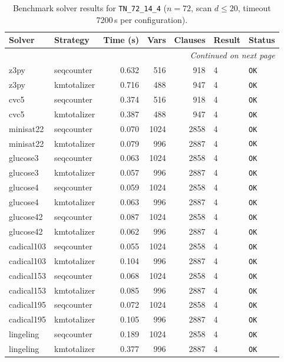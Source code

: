 \begin{longtable}{llrrrl p{}}
\caption{Benchmark solver results for \texttt{TN\_72\_14\_4} ($n=72$, scan $d \leq 20$, timeout 7200\,s per configuration).} \label{tab:bench-TN_72_14_4} \\
\toprule
Solver & Strategy & Time (s) & Vars & Clauses & Result & Status \\
\midrule
\endhead
\midrule
\multicolumn{7}{r}{\textit{Continued on next page}} \\
\midrule
\endfoot
\bottomrule
\endlastfoot
z3py & seqcounter & 0.632 & 516 & 918 & 4 & \texttt{OK} \\
z3py & kmtotalizer & 0.716 & 488 & 947 & 4 & \texttt{OK} \\
cvc5 & seqcounter & 0.374 & 516 & 918 & 4 & \texttt{OK} \\
cvc5 & kmtotalizer & 0.387 & 488 & 947 & 4 & \texttt{OK} \\
minisat22 & seqcounter & 0.070 & 1024 & 2858 & 4 & \texttt{OK} \\
minisat22 & kmtotalizer & 0.079 & 996 & 2887 & 4 & \texttt{OK} \\
glucose3 & seqcounter & 0.063 & 1024 & 2858 & 4 & \texttt{OK} \\
glucose3 & kmtotalizer & 0.057 & 996 & 2887 & 4 & \texttt{OK} \\
glucose4 & seqcounter & 0.059 & 1024 & 2858 & 4 & \texttt{OK} \\
glucose4 & kmtotalizer & 0.063 & 996 & 2887 & 4 & \texttt{OK} \\
glucose42 & seqcounter & 0.087 & 1024 & 2858 & 4 & \texttt{OK} \\
glucose42 & kmtotalizer & 0.062 & 996 & 2887 & 4 & \texttt{OK} \\
cadical103 & seqcounter & 0.055 & 1024 & 2858 & 4 & \texttt{OK} \\
cadical103 & kmtotalizer & 0.104 & 996 & 2887 & 4 & \texttt{OK} \\
cadical153 & seqcounter & 0.068 & 1024 & 2858 & 4 & \texttt{OK} \\
cadical153 & kmtotalizer & 0.085 & 996 & 2887 & 4 & \texttt{OK} \\
cadical195 & seqcounter & 0.072 & 1024 & 2858 & 4 & \texttt{OK} \\
cadical195 & kmtotalizer & 0.105 & 996 & 2887 & 4 & \texttt{OK} \\
lingeling & seqcounter & 0.189 & 1024 & 2858 & 4 & \texttt{OK} \\
lingeling & kmtotalizer & 0.377 & 996 & 2887 & 4 & \texttt{OK} \\

\end{longtable}
